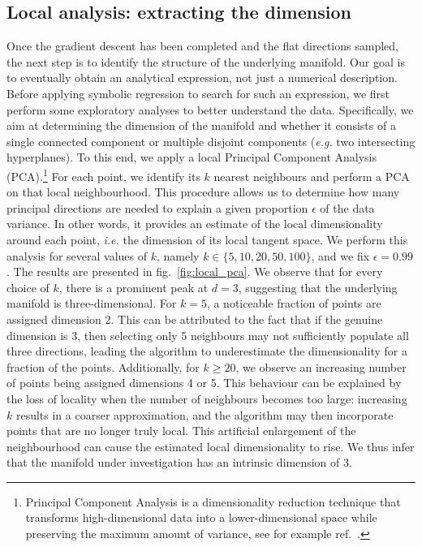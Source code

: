 \documentclass[11pt,a4paper]{article}
\begin{document}
	\subsection{Local analysis: extracting the dimension} \label{sec:localanalysis}
	Once the gradient descent has been completed and the flat directions sampled, the next step is to identify the structure of the underlying manifold. Our goal is to eventually obtain an analytical expression, not just a numerical description. Before applying symbolic regression to search for such an expression, we first perform some exploratory analyses to better understand the data. Specifically, we aim at determining the dimension of the manifold and whether it consists of a single connected component or multiple disjoint components (\textit{e.g.} two intersecting hyperplanes). To this end, we apply a local Principal Component Analysis (PCA).\footnote{Principal Component Analysis is a dimensionality reduction technique that transforms high-dimensional data into a lower-dimensional space while preserving the maximum amount of variance, see for example ref.~\cite{scikit-learn}.} %
	For each point, we identify its $k$ nearest neighbours and perform a PCA on that local neighbourhood. This procedure allows us to determine how many principal directions are needed to explain a given proportion $\epsilon$ of the data variance. In other words, it provides an estimate of the local dimensionality around each point, \textit{i.e.} the dimension of its local tangent space. We perform this analysis for several values of $k$, namely $k \in \{5, 10, 20, 50, 100\}$, and we fix $\epsilon = 0.99$. The results are presented in fig.~\ref{fig:local_pca}. We observe that for every choice of $k$, there is a prominent peak at $d = 3$, suggesting that the underlying manifold is three-dimensional. For $k = 5$, a noticeable fraction of points are assigned dimension 2. This can be attributed to the fact that if the genuine dimension is 3, then selecting only 5 neighbours may not sufficiently populate all three directions, leading the algorithm to underestimate the dimensionality for a fraction of the points. Additionally, for $k \geq 20$, we observe an increasing number of points being assigned dimensions 4 or 5. This behaviour can be explained by the loss of locality when the number of neighbours becomes too large: increasing $k$ results in a coarser approximation, and the algorithm may then incorporate points that are no longer truly local. This artificial enlargement of the neighbourhood can cause the estimated local dimensionality to rise. We thus infer that the manifold under investigation has an intrinsic dimension of 3.
\end{document}
